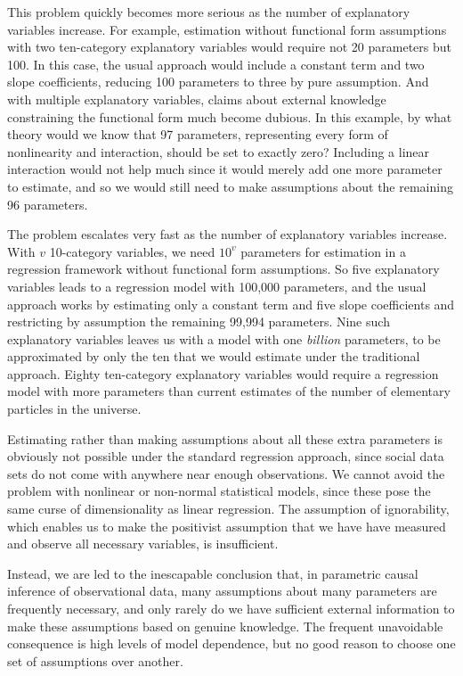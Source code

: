 \documentclass[11pt,titlepage]{article}
\begin{document}
This problem quickly becomes more serious as the number of explanatory
variables increase.  For example, estimation without functional form
assumptions with two ten-category explanatory variables would require
not 20 parameters but 100.  In this case, the usual approach would
include a constant term and two slope coefficients, reducing 100
parameters to three by pure assumption.  And with multiple explanatory
variables, claims about external knowledge constraining the functional
form much become dubious.  In this example, by what theory would we
know that 97 parameters, representing every form of nonlinearity and
interaction, should be set to exactly zero?  Including a linear
interaction would not help much since it would merely add one more
parameter to estimate, and so we would still need to make assumptions
about the remaining 96 parameters.

The problem escalates very fast as the number of explanatory variables
increase.  With $v$ 10-category variables, we need $10^v$ parameters
for estimation in a regression framework without functional form
assumptions.  So five explanatory variables leads to a regression
model with 100,000 parameters, and the usual approach works by
estimating only a constant term and five slope coefficients and
restricting by assumption the remaining 99,994 parameters.  Nine such
explanatory variables leaves us with a model with one \emph{billion}
parameters, to be approximated by only the ten that we would estimate
under the traditional approach.  Eighty ten-category explanatory
variables would require a regression model with more parameters than
current estimates of the number of elementary particles in the
universe.

Estimating rather than making assumptions about all these extra
parameters is obviously not possible under the standard regression
approach, since social data sets do not come with anywhere near enough
observations.  We cannot avoid the problem with nonlinear or
non-normal statistical models, since these pose the same curse of
dimensionality as linear regression.  The assumption of ignorability,
which enables us to make the positivist assumption that we have have
measured and observe all necessary variables, is insufficient.

Instead, we are led to the inescapable conclusion that, in parametric
causal inference of observational data, many assumptions about many
parameters are frequently necessary, and only rarely do we have
sufficient external information to make these assumptions based on
genuine knowledge.  The frequent unavoidable consequence is high
levels of model dependence, but no good reason to choose one set of
assumptions over another.
\end{document}
